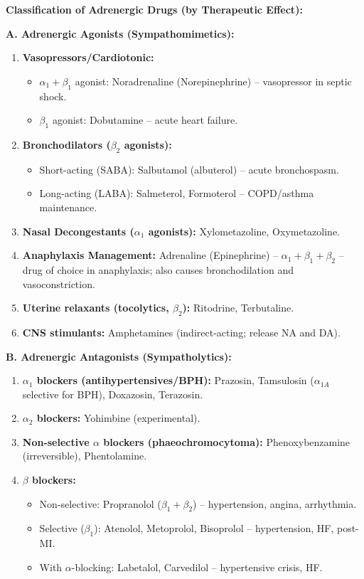 \documentclass[11pt,a4paper]{article}
\begin{document}
\begin{ansbox}
\textbf{Classification of Adrenergic Drugs (by Therapeutic Effect):}

\textbf{A. Adrenergic Agonists (Sympathomimetics):}
\begin{enumerate}[leftmargin=*]
    \item \textbf{Vasopressors/Cardiotonic:}
    \begin{itemize}
        \item $\alpha_1 + \beta_1$ agonist: Noradrenaline (Norepinephrine) -- vasopressor in septic shock.
        \item $\beta_1$ agonist: Dobutamine -- acute heart failure.
    \end{itemize}
    \item \textbf{Bronchodilators ($\beta_2$ agonists):}
    \begin{itemize}
        \item Short-acting (SABA): Salbutamol (albuterol) -- acute bronchospasm.
        \item Long-acting (LABA): Salmeterol, Formoterol -- COPD/asthma maintenance.
    \end{itemize}
    \item \textbf{Nasal Decongestants ($\alpha_1$ agonists):} Xylometazoline, Oxymetazoline.
    \item \textbf{Anaphylaxis Management:} Adrenaline (Epinephrine) -- $\alpha_1+\beta_1+\beta_2$ -- drug of choice in anaphylaxis; also causes bronchodilation and vasoconstriction.
    \item \textbf{Uterine relaxants (tocolytics, $\beta_2$):} Ritodrine, Terbutaline.
    \item \textbf{CNS stimulants:} Amphetamines (indirect-acting; release NA and DA).
\end{enumerate}

\textbf{B. Adrenergic Antagonists (Sympatholytics):}
\begin{enumerate}[leftmargin=*]
    \item \textbf{$\alpha_1$ blockers (antihypertensives/BPH):} Prazosin, Tamsulosin ($\alpha_{1A}$ selective for BPH), Doxazosin, Terazosin.
    \item \textbf{$\alpha_2$ blockers:} Yohimbine (experimental).
    \item \textbf{Non-selective $\alpha$ blockers (phaeochromocytoma):} Phenoxybenzamine (irreversible), Phentolamine.
    \item \textbf{$\beta$ blockers:}
    \begin{itemize}
        \item Non-selective: Propranolol ($\beta_1 + \beta_2$) -- hypertension, angina, arrhythmia.
        \item Selective ($\beta_1$): Atenolol, Metoprolol, Bisoprolol -- hypertension, HF, post-MI.
        \item With $\alpha$-blocking: Labetalol, Carvedilol -- hypertensive crisis, HF.
    \end{itemize}
\end{enumerate}


\end{ansbox}
\end{document}
